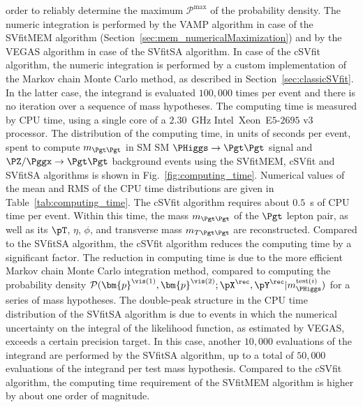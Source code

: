 order to reliably determine the maximum $\mathcal{P}^{\textrm{max}}$ of the probability density.
The numeric integration is performed by the VAMP algorithm in case of
the SVfitMEM algorithm (\cf Section~\ref{sec:mem_numericalMaximization}) and by the VEGAS algorithm
in case of the SVfitSA algorithm.
In case of the cSVfit algorithm, the numeric integration is performed
by a custom implementation of the Markov chain Monte Carlo method, as described in Section~\ref{sec:classicSVfit}.
In the latter case, the integrand is evaluated $100,000$ times per event and there is no
iteration over a sequence of mass hypotheses.
The computing time is measured by CPU time, 
using a single core of a $2.30$~GHz Intel\TReg~Xeon\TReg~E$5$-$2695$ v$3$ processor.
The distribution of the computing time, in units of seconds per event, 
spent to compute $m_{\Pgt\Pgt}$
in SM SM $\PHiggs \to \Pgt\Pgt$ signal and $\PZ/\Pggx \to \Pgt\Pgt$ background events
using the SVfitMEM, cSVfit and SVfitSA algorithms is shown in
Fig.~\ref{fig:computing_time}.
Numerical values of the mean and RMS of the CPU time distributions are given in Table~\ref{tab:computing_time}.
The cSVfit algorithm requires about $0.5$~s of CPU time per event.
Within this time, the mass $m_{\Pgt\Pgt}$ of the $\Pgt$ lepton pair,
as well as its $\pT$, $\eta$, $\phi$, and transverse mass
$m_{T\Pgt\Pgt}$ are reconstructed.
Compared to the SVfitSA algorithm, the cSVfit algorithm reduces the
computing time by a significant factor. 
The reduction in computing time is
due to the more efficient Markov chain Monte
Carlo integration method, compared to
computing the probability density
$\mathcal{P}(\bm{p}^{\vis(1)},\bm{p}^{\vis(2)};\pX^{\rec},\pY^{\rec}|m_{\PHiggs}^{\textrm{test}(i)})$
for a series of mass hypotheses.
The double-peak structure in the CPU time distribution of the SVfitSA algorithm is due to events in which the numerical uncertainty on the integral of the likelihood function, 
as estimated by VEGAS, exceeds a certain precision target.
In this case, another $10,000$ evaluations of the integrand are performed by the SVfitSA algorithm, up to a total of $50,000$ evaluations of the integrand per test mass hypothesis.
Compared to the cSVfit algorithm, the computing time requirement of the SVfitMEM algorithm is higher
by about one order of magnitude. 


